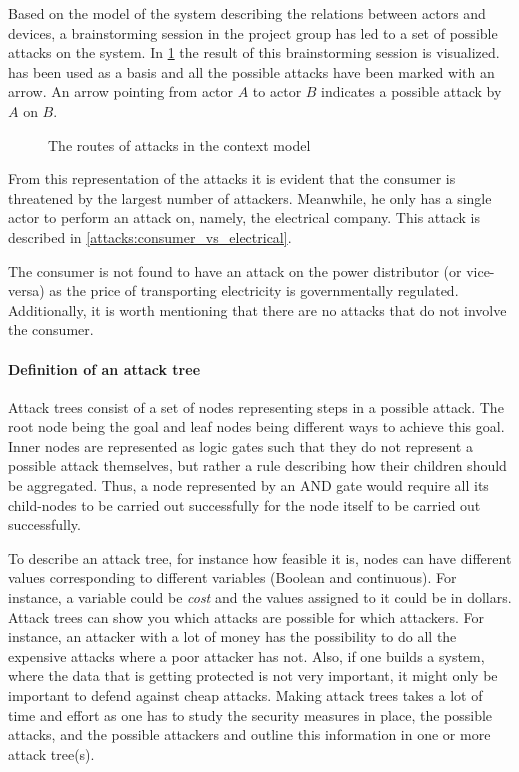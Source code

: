 
Based on the model of the system describing the relations between actors and devices, a brainstorming session in the project group has led to a set of possible attacks on the system.
In \cref{contextual:sm_model_attack} the result of this brainstorming session is visualized.
 has been used as a basis and all the possible attacks have been marked with an arrow.
An arrow pointing from actor $A$ to actor $B$ indicates a possible attack by $A$ on $B$.

\begin{figure}[h]
  \centering
  
  \caption{The routes of attacks in the context model}
  \label{contextual:sm_model_attack}
\end{figure}

From this representation of the attacks it is evident that the consumer is threatened by the largest number of attackers.
Meanwhile, he only has a single actor to perform an attack on, namely, the electrical company.
This attack is described in \cref{attacks:consumer_vs_electrical}.

The consumer is not found to have an attack on the power distributor (or vice-versa) as the price of transporting electricity is governmentally regulated.
Additionally, it is worth mentioning that there are no attacks that do not involve the consumer.

\paragraph{Definition of an attack tree}
Attack trees consist of a set of nodes representing steps in a possible attack.
The root node being the goal and leaf nodes being different ways to achieve this goal.
Inner nodes are represented as logic gates such that they do not represent a possible attack themselves, but rather a rule describing how their children should be aggregated.
Thus, a node represented by an AND gate would require all its child-nodes to be carried out successfully for the node itself to be carried out successfully.

To describe an attack tree, for instance how feasible it is, nodes can have different values corresponding to different variables (Boolean and continuous).
For instance, a variable could be \textit{cost} and the values assigned to it could be in dollars.
Attack trees can show you which attacks are possible for which attackers.
For instance, an attacker with a lot of money has the possibility to do all the expensive attacks where a poor attacker has not.
Also, if one builds a system, where the data that is getting protected is not very important, it might only be important to defend against cheap attacks.
Making attack trees takes a lot of time and effort as one has to study the security measures in place, the possible attacks, and the possible attackers and outline this information in one or more attack tree(s).\cite{schneier_attack_trees}
